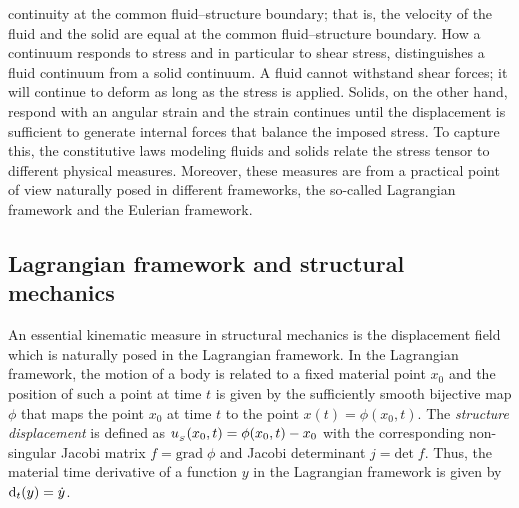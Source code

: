 continuity at the common fluid--structure boundary; that is, the
velocity of the fluid and the solid are equal at the common
fluid--structure boundary. How a continuum
responds to stress and in particular to shear stress, distinguishes a
fluid continuum from a solid continuum. A fluid cannot withstand shear
forces; it will continue to deform as long as the stress is
applied. Solids, on the other hand, respond with an angular strain and
the strain continues until the displacement is sufficient to generate
internal forces that balance the imposed stress. To capture this, the
constitutive laws modeling fluids and solids relate the stress tensor
to different physical measures. Moreover, these measures are from a
practical point of view naturally posed in different frameworks, the
so-called Lagrangian framework and the Eulerian framework.


\vspace*{-2pt}\enlargethispage*{12pt}
\subsection{Lagrangian framework and structural mechanics}

An essential kinematic measure in structural mechanics is the
displacement field which is naturally posed in the Lagrangian
framework.  In the Lagrangian framework, the motion of a body is
related to a fixed material point $x_0$ and the position of
such a point at time $t$ is given by the sufficiently smooth bijective
map $\phi$ that maps the point $x_0$ at time $t$ to the point $x(t)=
\phi(x_0,t)$. The \emph{structure displacement} is defined as
$u_{_{S}}(x_0,t) = \phi(x_0, t) - x_0$ with the corresponding non-singular
Jacobi matrix $f = \textrm{grad}\;\phi$ and Jacobi determinant $j =
\textrm{det}\; f$. Thus, the material time derivative of a function $y$
in the Lagrangian framework is given by $\textrm{d}_t(y) = \dot{y}$.

